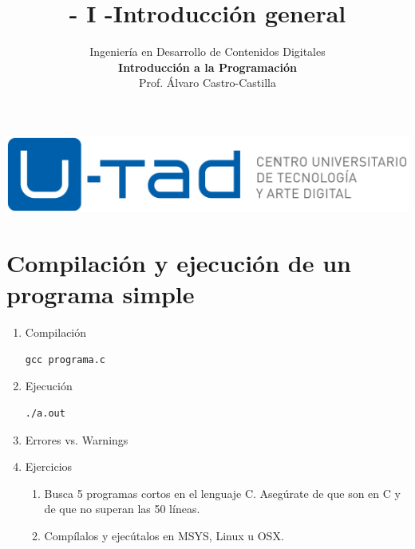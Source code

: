 \documentclass[a4paper,oneside]{article}
\title{- I -\linebreak Introducción general}
\author{Ingeniería en Desarrollo de Contenidos Digitales\\ \textbf{Introducción a la Programación}\\ Prof. Álvaro Castro-Castilla}
\date{}
\begin{document}
\maketitle

\begin{center}
\includegraphics[scale=0.3,resolution=300]{images/utad.png}
\end{center}


\section{Compilación y ejecución de un programa simple}
  \begin{enumerate}
  \item Compilación

    \begin{verbatim}
gcc programa.c
    \end{verbatim}
  \item Ejecución

    \begin{verbatim}
./a.out
    \end{verbatim}
  \item Errores vs. Warnings
  \item Ejercicios
    \begin{enumerate}
    \item Busca 5 programas cortos en el lenguaje C. Asegúrate de que son en C y de que no superan las 50 líneas.
    \item Compílalos y ejecútalos en MSYS, Linux u OSX.
    \end{enumerate}
  \end{enumerate}
\end{document}

